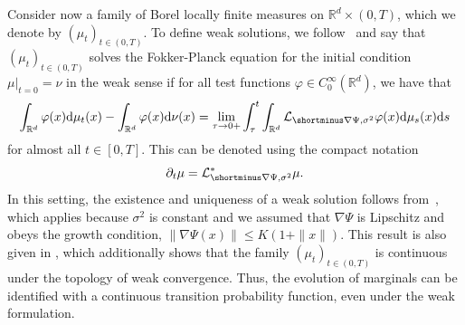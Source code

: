 \documentclass[twoside]{article}
\newcommand{\R} {\mathbb R}
\begin{document}
Consider now a family of Borel locally finite measures on $\R^d \times (0,T)$, which we denote by $(\mu_t)_{t \in (0,T)}$.
To define weak solutions, we follow~\citep[Definition 6.1.1, Proposition 6.1.2(ii)]{bogachev2022fokker} and say that $(\mu_t)_{t \in (0,T)}$ solves the Fokker-Planck equation for the initial condition 
 $\mu|_{t=0}=\nu$ in the weak sense
 if for all test functions $\varphi \in C_0^\infty(\R^d)$, we have that
\begin{align}\label{eq: weak_FP}
    \int_{\R^d}\varphi(x)\mathrm{d}\mu_t(x)
    -
    \int_{\R^d}\varphi(x)\mathrm{d}\nu(x)
    =
    \lim_{\tau\to 0+}\int_{\tau}^t\int_{\R^d}\mathcal{L}_{\shortminus \nabla \Psi, \sigma^2}\varphi(x)\mathrm{d}\mu_s(x)\mathrm{d}s
\end{align}
for almost all $t\in[0,T]$. This can be denoted using the compact notation 
\begin{align}
    \partial_t \mu = \mathcal{L}^*_{\shortminus\nabla \Psi, \sigma^2}\mu.
\end{align}
In this setting, the existence and uniqueness of a weak solution follows from~\citep[Theorem 9.4.8, Example 9.4.7]{bogachev2022fokker}, which applies because $\sigma^2$ is constant and we assumed that $\nabla \Psi$ is Lipschitz and obeys the growth condition, $\|\nabla\Psi(x)\|\le K(1+\|x\|)$. This result is also given in \citet[Theorem 1.1.9]{stroock2008partial}, which additionally shows that the family $(\mu_t)_{t \in (0,T)}$ is continuous under the topology of weak convergence. Thus, the evolution of marginals can be identified with a continuous transition probability function, even under the weak formulation. 





\end{document}

